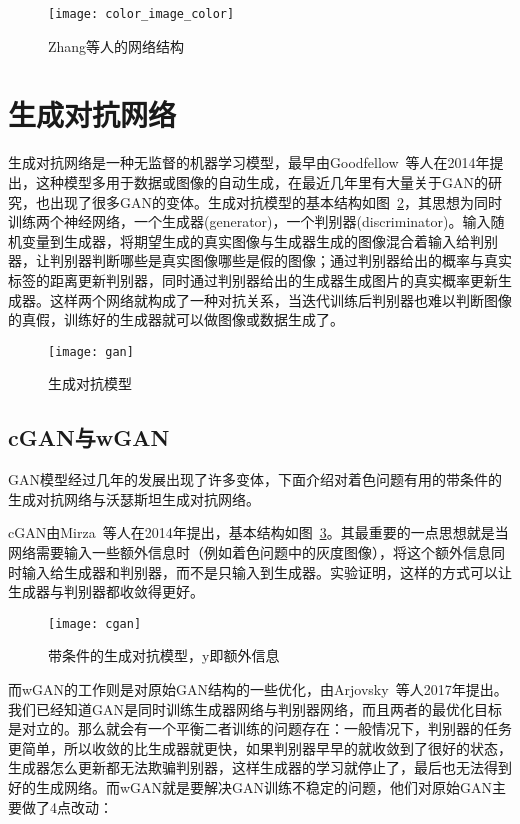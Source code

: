   \begin{figure}[H]
    \centering
    \texttt{[image: color\_image\_color]}
    \caption{Zhang等人的网络结构}
    \label{fig:color_image_color}
  \end{figure}

\section{生成对抗网络}
\label{sec:2-gan}

  生成对抗网络是一种无监督的机器学习模型，最早由Goodfellow~\cite{DBLP:conf/nips/GoodfellowPMXWOCB14}等人在2014年提出，这种模型多用于数据或图像的自动生成，在最近几年里有大量关于GAN的研究，也出现了很多GAN的变体。生成对抗模型的基本结构如图~\ref{fig:gan}，其思想为同时训练两个神经网络，一个生成器(generator)，一个判别器(discriminator)。输入随机变量到生成器，将期望生成的真实图像与生成器生成的图像混合着输入给判别器，让判别器判断哪些是真实图像哪些是假的图像；通过判别器给出的概率与真实标签的距离更新判别器，同时通过判别器给出的生成器生成图片的真实概率更新生成器。这样两个网络就构成了一种对抗关系，当迭代训练后判别器也难以判断图像的真假，训练好的生成器就可以做图像或数据生成了。

  \begin{figure}[H]
    \centering
    \texttt{[image: gan]}
    \caption{生成对抗模型}
    \label{fig:gan}
  \end{figure}

\subsection{cGAN与wGAN}
\label{sec:2-cgan-and-wgan}
  
  GAN模型经过几年的发展出现了许多变体，下面介绍对着色问题有用的带条件的生成对抗网络与沃瑟斯坦生成对抗网络。

  cGAN由Mirza~\cite{DBLP:journals/corr/MirzaO14}等人在2014年提出，基本结构如图~\ref{fig:cgan}。其最重要的一点思想就是当网络需要输入一些额外信息时（例如着色问题中的灰度图像），将这个额外信息同时输入给生成器和判别器，而不是只输入到生成器。实验证明，这样的方式可以让生成器与判别器都收敛得更好。

  \begin{figure}[H]
    \centering
    \texttt{[image: cgan]}
    \caption[带条件的生成对抗模型]{带条件的生成对抗模型，y即额外信息}
    \label{fig:cgan}
  \end{figure}

  而wGAN的工作则是对原始GAN结构的一些优化，由Arjovsky~\cite{DBLP:journals/corr/ArjovskyCB17}等人2017年提出。我们已经知道GAN是同时训练生成器网络与判别器网络，而且两者的最优化目标是对立的。那么就会有一个平衡二者训练的问题存在：一般情况下，判别器的任务更简单，所以收敛的比生成器就更快，如果判别器早早的就收敛到了很好的状态，生成器怎么更新都无法欺骗判别器，这样生成器的学习就停止了，最后也无法得到好的生成网络。而wGAN就是要解决GAN训练不稳定的问题，他们对原始GAN主要做了4点改动：

